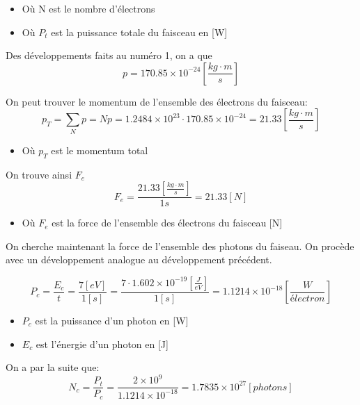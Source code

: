 \begin{itemize}
\item Où N est le nombre d'électrons
\item Où $P_t$ est la puissance totale du faisceau en [W]
\end{itemize}

Des développements faits au numéro 1, on a que
\begin{equation}
p = 170.85\times 10^{-24}\left[\frac{kg \cdot m}{s}\right]
\end{equation}

On peut trouver le momentum de l'ensemble des électrons du faisceau:
\begin{equation}
p_{T} = \sum_{N} p = Np = 1.2484\times 10^{23} \cdot 170.85\times 10^{-24} = 21.33\left[\frac{kg \cdot m}{s}\right]
\end{equation}
\begin{itemize}
\item Où $p_{T}$ est le momentum total
\end{itemize}

On trouve ainsi $F_e$
\begin{equation}
F_{e} = \frac{21.33 \left[\frac{kg \cdot m}{s}\right]}{1 s} = 21.33\left[N\right]
\end{equation}
\begin{itemize}
\item Où $F_{e}$ est la force de l'ensemble des électrons du faisceau [N]
\end{itemize}


On cherche maintenant la force de l'ensemble des photons du faiseau. On procède avec un développement analogue au développement précédent.

\begin{equation}
P_{c} = \frac{E_{c}}{t} = \frac{7 \left[eV\right]}{1 \left[s\right]} = \frac{7 \cdot 1.602\times 10^{-19} \left[\frac{J}{eV}\right]}{1 \left[s\right]} = 1.1214\times 10^{-18}\left[\frac{W}{électron}\right]
\end{equation}
\begin{itemize}
\item $P_{c}$ est la puissance d'un photon en [W]
\item $E_{c}$ est l'énergie d'un photon en [J]
\end{itemize}
On a par la suite que:
\begin{equation}
N_c = \frac{P_t}{P_c} = \frac{2 \times 10^{9}}{1.1214\times 10^{-18}} = 1.7835\times 10^{27}\left[photons\right]
\end{equation}

